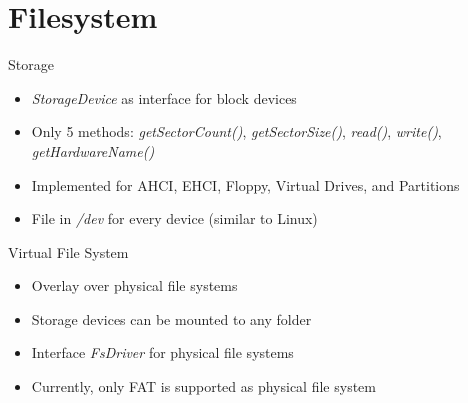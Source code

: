 \section{Filesystem}

\begin{frame}{Storage}
\begin{itemize}
	\item \textit{StorageDevice} as interface for block devices
	\item Only 5 methods: \textit{getSectorCount()}, \textit{getSectorSize()}, \textit{read()}, \textit{write()}, \textit{getHardwareName()}
	\item Implemented for AHCI, EHCI, Floppy, Virtual Drives, and Partitions
	\item File in \textit{/dev} for every device (similar to Linux)
\end{itemize}	
\end{frame}

\begin{frame}{Virtual File System}
\begin{itemize}
	\item Overlay over physical file systems
	\item Storage devices can be mounted to any folder
	\item Interface \textit{FsDriver} for physical file systems
	\item Currently, only FAT is supported as physical file system
\end{itemize}	
\end{frame}
